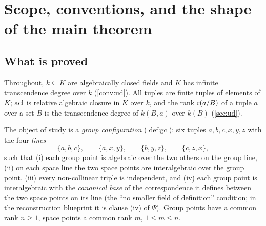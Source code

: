 \section{Scope, conventions, and the shape of the main theorem}
\label{sec:scope}

\subsection{What is proved}

Throughout, $k\subseteq K$ are algebraically closed fields and $K$ has infinite
transcendence degree over $k$ (\cref{conv:ud}).  All tuples are finite tuples of
elements of $K$; $\operatorname{acl}$ is relative algebraic closure in $K$ over $k$, and the
rank $\operatorname{r}(a/B)$ of a tuple $a$ over a set $B$ is the transcendence degree of
$k(B,a)$ over $k(B)$ (\cref{sec:ud}).

The object of study is a \emph{group configuration} (\cref{def:gc}): six tuples
$a,b,c,x,y,z$ with the four \emph{lines}
\[
  \{a,b,c\},\qquad \{a,x,y\},\qquad \{b,y,z\},\qquad \{c,z,x\},
\]
such that (i) each group point is algebraic over the two others on the group line,
(ii) on each space line the two space points are interalgebraic over the group point,
(iii) every non-collinear triple is independent, and (iv) each group point is
interalgebraic with the \emph{canonical base} of the correspondence it defines
between the two space points on its line (the ``no smaller field of definition''
condition; in the reconstruction blueprint it is clause (iv) of $\Psi$).  Group
points have a common rank $n\ge 1$, space points a common rank $m$, $1\le m\le n$.

